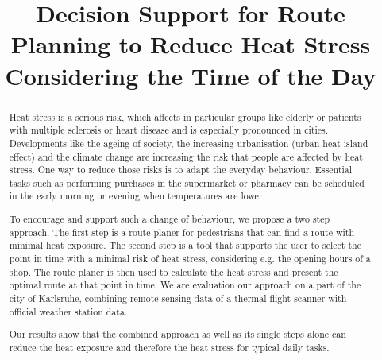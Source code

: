 \documentclass[a4paper,parskip=half]{scrartcl}
\title{Decision Support for Route Planning to Reduce Heat Stress Considering the Time of the Day}
\author{}
\begin{document}
\maketitle

\begin{abstract}
	Heat stress is a serious risk, which affects in particular  groups like elderly or patients with multiple sclerosis or heart disease and is especially pronounced in cities. Developments like the ageing of society, the increasing urbanisation (urban heat island effect) and the climate change are increasing the risk that people are affected by heat stress. One way to reduce those risks is to adapt the everyday behaviour. Essential tasks such as performing purchases in the supermarket or pharmacy can be scheduled in the early morning or evening when temperatures are lower. 
	
To encourage and support such a change of behaviour, we propose a two step approach. The first step is a route planer for pedestrians that can find a route with minimal heat exposure. The second step is a tool that supports the user to select the point in time with a minimal risk of heat stress, considering e.g. the opening hours of a shop. The route planer is then used to calculate the heat stress and present the optimal route at that point in time.
We are evaluation our approach on a part of the city of Karlsruhe, combining remote sensing data of a thermal flight scanner with official weather station data. 
	
Our results show that the combined approach as well as its single steps alone can reduce the heat exposure and therefore the heat stress for typical daily tasks.
\end{abstract}





%


\printbibliography
\end{document}
